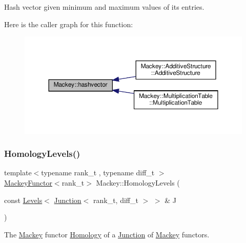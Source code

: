 Hash vector given minimum and maximum values of its entries. 

Here is the caller graph for this function\+:\nopagebreak
\begin{figure}[H]
\begin{center}
\leavevmode
\includegraphics[width=350pt]{namespaceMackey_a3d23281b881eb1f166107b333fa98612_icgraph}
\end{center}
\end{figure}
\mbox{\label{namespaceMackey_a1c195484cc947abef84c726b534af5a5}} 
\subsubsection{\texorpdfstring{Homology\+Levels()}{HomologyLevels()}}
{\footnotesize\ttfamily template$<$typename rank\+\_\+t , typename diff\+\_\+t $>$ \\
\hyperlink{classMackey_1_1MackeyFunctor}{Mackey\+Functor}$<$rank\+\_\+t$>$ Mackey\+::\+Homology\+Levels (\begin{DoxyParamCaption}\item[{const \hyperlink{classMackey_1_1Levels}{Levels}$<$ \hyperlink{classMackey_1_1Junction}{Junction}$<$ rank\+\_\+t, diff\+\_\+t $>$ $>$ \&}]{J }\end{DoxyParamCaption})}



The \hyperlink{namespaceMackey}{Mackey} functor \hyperlink{classMackey_1_1Homology}{Homology} of a \hyperlink{classMackey_1_1Junction}{Junction} of \hyperlink{namespaceMackey}{Mackey} functors. 

